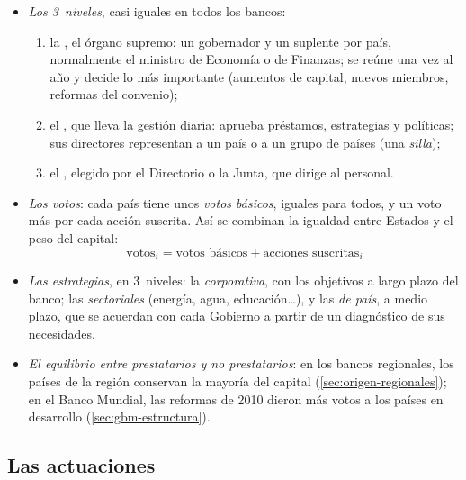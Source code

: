 \documentclass[11pt]{article}
\begin{document}
\begin{itemize}
\item \emph{Los 3~niveles}, casi iguales en todos los bancos:
  \begin{enumerate}
  \item la , el órgano supremo: un gobernador y un suplente por país, normalmente el ministro de Economía o de Finanzas; se reúne una vez al año y decide lo más importante (aumentos de capital, nuevos miembros, reformas del convenio);
  \item el , que lleva la gestión diaria: aprueba préstamos, estrategias y políticas; sus directores representan a un país o a un grupo de países (una \emph{silla});
  \item el , elegido por el Directorio o la Junta, que dirige al personal.
  \end{enumerate}
\item \emph{Los votos}: cada país tiene unos \emph{votos básicos}, iguales para todos, y un voto más por cada acción suscrita. Así se combinan la igualdad entre Estados y el peso del capital:
  \begin{equation}\label{eq:votos}
  \text{votos}_i=\text{votos básicos}+\text{acciones suscritas}_i
  \end{equation}
\item \emph{Las estrategias}, en 3~niveles: la \emph{corporativa}, con los objetivos a largo plazo del banco; las \emph{sectoriales} (energía, agua, educación…), y las \emph{de país}, a medio plazo, que se acuerdan con cada Gobierno a partir de un diagnóstico de sus necesidades.
\item \emph{El equilibrio entre prestatarios y no prestatarios}: en los bancos regionales, los países de la región conservan la mayoría del capital (\ref{sec:origen-regionales}); en el Banco Mundial, las reformas de 2010 dieron más votos a los países en desarrollo (\ref{sec:gbm-estructura}).
\end{itemize}

\subsection{Las actuaciones}\label{sec:actuaciones}
\end{document}
